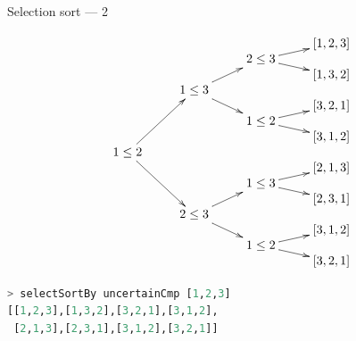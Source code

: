 \documentclass[handout]{beamer}
\begin{document}
\begin{frame}[fragile]{Selection sort --- 2}

\vspace{-4ex}

$$\xymatrix@R-2.2pc{
                             &                          &                        & [1,2,3] \\
                             &                          & 2 \le 3 \ar[ur]\ar[dr] &         \\
                             &                          &                        & [1,3,2] \\
                             & 1 \le 3 \ar[uur]\ar[ddr] &                        &         \\
                             &                          &                        & [3,2,1] \\
                             &                          & 1 \le 2 \ar[ur]\ar[dr] &         \\
                             &                          &                        & [3,1,2] \\
1 \le 2 \ar[uuuur]\ar[ddddr] &                          &                        &         \\
                             &                          &                        & [2,1,3] \\
                             &                          & 1 \le 3 \ar[ur]\ar[dr] &         \\
                             &                          &                        & [2,3,1] \\
                             & 2 \le 3 \ar[uur]\ar[ddr] &                        &         \\
                             &                          &                        & [3,1,2] \\
                             &                          & 1 \le 2 \ar[ur]\ar[dr] &         \\
                             &                          &                        & [3,2,1] \\
}$$

\vspace{-3ex}

\begin{lstlisting}[language=Haskell]
> selectSortBy uncertainCmp [1,2,3]
[[1,2,3],[1,3,2],[3,2,1],[3,1,2],
 [2,1,3],[2,3,1],[3,1,2],[3,2,1]]
\end{lstlisting}

\end{frame}
\end{document}

